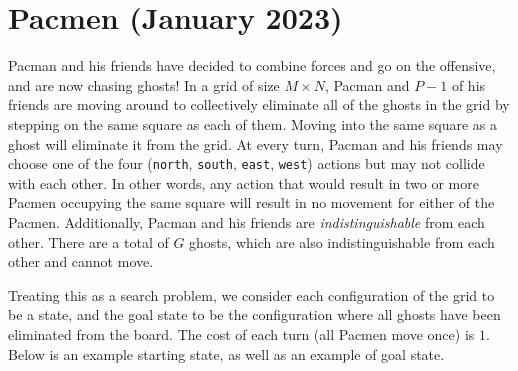 \documentclass[11pt, a4paper]{article}
\begin{document}
\newpage

\section{Pacmen (January 2023)}

Pacman and his friends have decided to combine forces and go on the offensive, and are now chasing ghosts! In a grid of size $M \times N$, Pacman and $P - 1$ of his friends are moving around to collectively eliminate all of the ghosts in the grid by stepping on the same square as each of them. Moving into the same square as a ghost will eliminate it from the grid. At every turn, Pacman and his friends may choose one of the four (\texttt{north}, \texttt{south}, \texttt{east}, \texttt{west}) actions but may not collide with each other. In other words, any action that would result in two or more Pacmen occupying the same square will result in no movement for either of the Pacmen. Additionally, Pacman and his friends are \emph{indistinguishable} from each other. There are a total of $G$ ghosts, which are also indistinguishable from each other and cannot move.

Treating this as a search problem, we consider each configuration of the grid to be a state, and the goal state to be the configuration where all ghosts have been eliminated from the board. The cost of each turn (all Pacmen move once) is $1$. Below is an example starting state, as well as an example of goal state.
\end{document}
